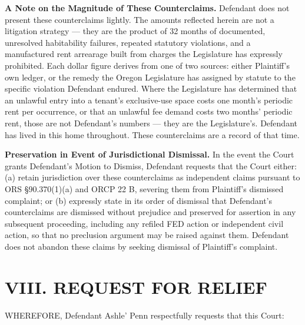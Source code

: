 \documentclass[12pt,letterpaper]{article}
\begin{document}
	\textbf{A Note on the Magnitude of These Counterclaims.} Defendant does not present these counterclaims lightly. The amounts reflected herein are not a litigation strategy --- they are the product of 32 months of documented, unresolved habitability failures, repeated statutory violations, and a manufactured rent arrearage built from charges the Legislature has expressly prohibited. Each dollar figure derives from one of two sources: either Plaintiff's own ledger, or the remedy the Oregon Legislature has assigned by statute to the specific violation Defendant endured. Where the Legislature has determined that an unlawful entry into a tenant's exclusive-use space costs one month's periodic rent per occurrence, or that an unlawful fee demand costs two months' periodic rent, those are not Defendant's numbers --- they are the Legislature's. Defendant has lived in this home throughout. These counterclaims are a record of that time.
	
	\textbf{Preservation in Event of Jurisdictional Dismissal.} In the event the Court grants Defendant's Motion to Dismiss, Defendant requests that the Court either: (a) retain jurisdiction over these counterclaims as independent claims pursuant to ORS \S90.370(1)(a) and ORCP 22 B, severing them from Plaintiff's dismissed complaint; or (b) expressly state in its order of dismissal that Defendant's counterclaims are dismissed without prejudice and preserved for assertion in any subsequent proceeding, including any refiled FED action or independent civil action, so that no preclusion argument may be raised against them. Defendant does not abandon these claims by seeking dismissal of Plaintiff's complaint.
	
	\section*{VIII. REQUEST FOR RELIEF}
	
	WHEREFORE, Defendant Ashle' Penn respectfully requests that this Court:
	
\end{document}
